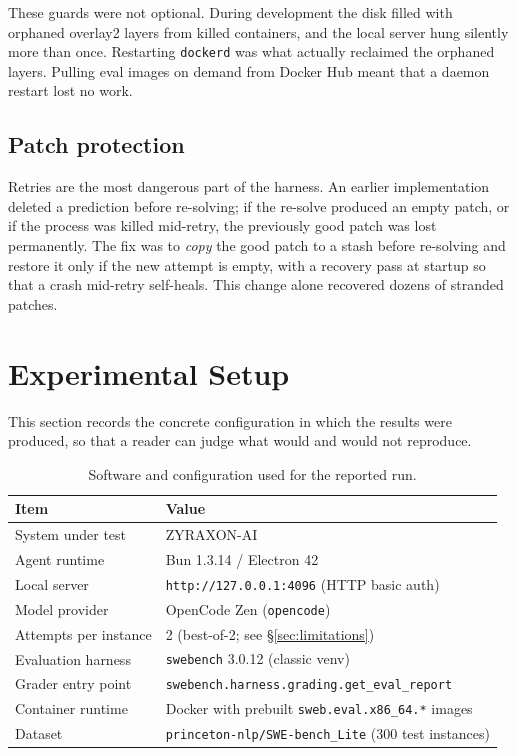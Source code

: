 \documentclass[11pt,a4paper]{article}
\begin{document}
These guards were not optional. During development the disk filled with orphaned
overlay2 layers from killed containers, and the local server hung silently more than
once. Restarting \texttt{dockerd} was what actually reclaimed the orphaned layers.
Pulling eval images on demand from Docker Hub meant that a daemon restart lost no work.

\subsection{Patch protection}

Retries are the most dangerous part of the harness. An earlier implementation deleted a
prediction before re-solving; if the re-solve produced an empty patch, or if the process
was killed mid-retry, the previously good patch was lost permanently. The fix was to
\emph{copy} the good patch to a stash before re-solving and restore it only if the new
attempt is empty, with a recovery pass at startup so that a crash mid-retry self-heals.
This change alone recovered dozens of stranded patches.

\section{Experimental Setup}
\label{sec:setup}

This section records the concrete configuration in which the results were
produced, so that a reader can judge what would and would not reproduce.

\begin{table}[H]
\centering
\caption{Software and configuration used for the reported run.}
\label{tab:setup}
\begin{tabular}{@{}ll@{}}
\toprule
Item & Value \\
\midrule
System under test & ZYRAXON-AI \\
Agent runtime & Bun 1.3.14 / Electron 42 \\
Local server & \texttt{http://127.0.0.1:4096} (HTTP basic auth) \\
Model provider & OpenCode Zen (\texttt{opencode}) \\
Attempts per instance & 2 (best-of-2; see \S\ref{sec:limitations}) \\
Evaluation harness & \texttt{swebench} 3.0.12 (classic venv) \\
Grader entry point & \texttt{swebench.harness.grading.get\_eval\_report} \\
Container runtime & Docker with prebuilt \texttt{sweb.eval.x86\_64.*} images \\
Dataset & \texttt{princeton-nlp/SWE-bench\_Lite} (300 test instances) \\
\bottomrule
\end{tabular}
\end{table}
\end{document}
